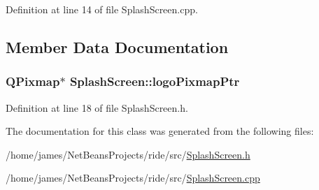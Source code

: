 Definition at line 14 of file Splash\-Screen.\-cpp.



\subsection{Member Data Documentation}
\hypertarget{class_splash_screen_af98b9d8aba6546a8c9ee627a9edb3bd8}{
\subsubsection[{logo\-Pixmap\-Ptr}]{\setlength{\rightskip}{0pt plus 5cm}Q\-Pixmap$\ast$ Splash\-Screen\-::logo\-Pixmap\-Ptr\hspace{0.3cm}{\ttfamily [private]}}}\label{class_splash_screen_af98b9d8aba6546a8c9ee627a9edb3bd8}


Definition at line 18 of file Splash\-Screen.\-h.



The documentation for this class was generated from the following files\-:\begin{DoxyCompactItemize}
\item 
/home/james/\-Net\-Beans\-Projects/ride/src/\hyperlink{_splash_screen_8h}{Splash\-Screen.\-h}\item 
/home/james/\-Net\-Beans\-Projects/ride/src/\hyperlink{_splash_screen_8cpp}{Splash\-Screen.\-cpp}\end{DoxyCompactItemize}
